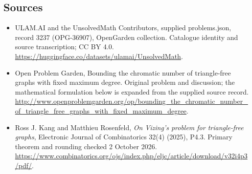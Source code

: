 \documentclass[11pt,a4paper]{article}
\begin{document}
\subsection{Sources}
\begin{itemize}
\item[S1] ULAM.AI and the UnsolvedMath Contributors, supplied problems.json, record 3237 (OPG-36907), OpenGarden collection. Catalogue identity and source transcription; CC BY 4.0.
\url{https://huggingface.co/datasets/ulamai/UnsolvedMath}.
\item[S2] Open Problem Garden, Bounding the chromatic number of triangle-free graphs with fixed maximum degree. Original problem and discussion; the mathematical formulation below is expanded from the supplied source record.
\url{http://www.openproblemgarden.org/op/bounding_the_chromatic_number_of_triangle_free_graphs_with_fixed_maximum_degree}.

\item[R1] Ross J. Kang and Matthieu Rosenfeld, \emph{On Vizing's
problem for triangle-free graphs}, Electronic Journal of Combinatorics
32(4) (2025), P4.3. Primary theorem and rounding checked 2 October 2026.
\url{https://www.combinatorics.org/ojs/index.php/eljc/article/download/v32i4p3/pdf/}.

\end{itemize}
\end{document}
